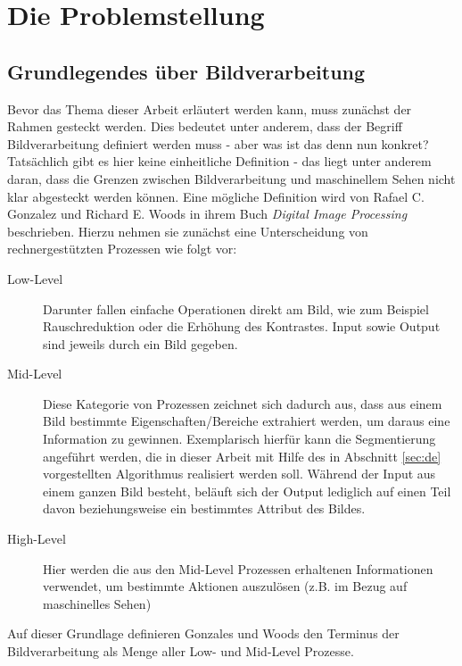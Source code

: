 \chapter{Die Problemstellung}
\label{sec:prob}
	
	\section{Grundlegendes über Bildverarbeitung}
	\label{sec:bild-basics}
	
	Bevor das Thema dieser Arbeit erläutert werden kann, muss zunächst der Rahmen gesteckt werden. Dies bedeutet unter anderem, dass der Begriff Bildverarbeitung definiert werden muss - aber was ist das denn nun konkret? Tatsächlich gibt es hier keine einheitliche Definition - das liegt unter anderem daran, dass die Grenzen zwischen Bildverarbeitung und maschinellem Sehen nicht klar abgesteckt werden können. Eine mögliche Definition wird von Rafael C. Gonzalez und Richard E. Woods in ihrem Buch \textit{Digital Image Processing} \cite[S. 1--3]{gonzalez-woods} beschrieben. Hierzu nehmen sie zunächst eine Unterscheidung von rechnergestützten Prozessen wie folgt vor: 
	
	\begin{description}
		\item[Low-Level] Darunter fallen einfache Operationen direkt am Bild, wie zum Beispiel Rauschreduktion oder die Erhöhung des Kontrastes. Input sowie Output sind jeweils durch ein Bild gegeben.
		\item[Mid-Level] Diese Kategorie von Prozessen zeichnet sich dadurch aus, dass aus einem Bild bestimmte Eigenschaften/Bereiche extrahiert werden, um daraus eine Information zu gewinnen. Exemplarisch hierfür kann die Segmentierung angeführt werden, die in dieser Arbeit mit Hilfe des in Abschnitt \ref{sec:de} vorgestellten Algorithmus realisiert werden soll. Während der Input aus einem ganzen Bild besteht, beläuft sich der Output lediglich auf einen Teil davon beziehungsweise ein bestimmtes Attribut des Bildes.
		\item[High-Level] Hier werden die aus den Mid-Level Prozessen erhaltenen Informationen verwendet, um bestimmte Aktionen auszulösen (z.B. im Bezug auf maschinelles Sehen)
	\end{description}
	
	Auf dieser Grundlage definieren Gonzales und Woods \cite[S. 1--3]{gonzalez-woods} den Terminus der Bildverarbeitung als Menge aller Low- und Mid-Level Prozesse. \\
	

